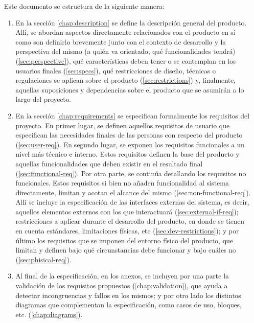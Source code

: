 Este documento se estructura de la siguiente manera:

\begin{enumerate}
  \item En la sección \ref{chap:description} se define la descripción general del
        producto. Allí, se abordan aspectos directamente relacionados con el producto en sí
        como son definirlo brevemente junto con el contexto de desarrollo y
        la perspectiva del mismo (a quién va orientado, qué funcionalidades tendrá)
        (\ref{sec:perspective}), qué características deben tener o se contemplan en
        los usuarios finales (\ref{sec:specs}), qué restricciones de diseño, técnicas
        o regulaciones se aplican sobre el producto (\ref{sec:restrictions}) y,
        finalmente, aquellas suposiciones y dependencias sobre el producto que se
        asumirán a lo largo del proyecto.
  \item En la sección \ref{chap:requirements} se especifican formalmente los
        requisitos del proyecto. En primer lugar, se definen aquellos requisitos
        de usuario que especifican las necesidades finales de las personas con respecto
        del producto (\ref{sec:user-req}). En segundo lugar, se exponen los requisitos
        funcionales a un nivel más técnico e interno. Estos requisitos definen la
        base del producto y aquellas funcionalidades que deben existir en el resultado
        final (\ref{sec:functional-req}). Por otra parte, se continúa detallando
        los requisitos no funcionales. Estos requisitos si bien no añaden funcionalidad
        al sistema directamente, limitan y acotan el alcance del mismo (\ref{sec:non-functional-req}).
        Allí se incluye la especificación de las interfaces externas
        del sistema, es decir, aquellos elementos externos con los que interactuará
        (\ref{sec:external-if-req}); restricciones a aplicar durante el desarrollo del
        producto, en donde se tienen en cuenta estándares, limitaciones físicas, etc
        (\ref{sec:dev-restrictions}); y por último los requisitos que se imponen del
        entorno físico del producto, que limitan y definen bajo qué circunstancias
        debe funcionar y bajo cuáles no (\ref{sec:phisical-req}).
  \item Al final de la especificación, en los anexos, se incluyen por una parte
        la validación de los requisitos propuestos (\ref{chap:validation}), que 
        ayuda a detectar incongruencias y fallos en los mismos; y por otro lado
        los distintos diagramas que complementan la especificación,
        como casos de uso, bloques, etc. (\ref{chap:diagrams}).
\end{enumerate}